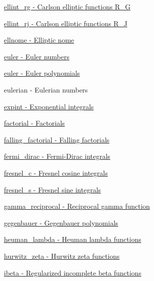 \begin{DoxyItemize}
\item \hyperlink{group__gnu__math__spec__func_gab525116e1b311da90e2745366ac314eb}{ellint\+\_\+rg -\/ Carlson elliptic functions R\+\_\+G}
\item \hyperlink{group__gnu__math__spec__func_gaf9a96979913713963c5f4edeba8c7f5a}{ellint\+\_\+rj -\/ Carlson elliptic functions R\+\_\+J}
\item \hyperlink{group__gnu__math__spec__func_ga7bfb34f8b5c0ed7c72040f9cb7034bba}{ellnome -\/ Elliptic nome}
\item \hyperlink{group__gnu__math__spec__func_gac956e6457ab7d0d1765d281e73073f55}{euler -\/ Euler numbers}
\item \hyperlink{group__gnu__math__spec__func_gac956e6457ab7d0d1765d281e73073f55}{euler -\/ Euler polynomials}
\item eulerian -\/ Eulerian numbers
\item \hyperlink{group__gnu__math__spec__func_ga2cfc699129ceac9cfed87c61e6dc0e08}{expint -\/ Exponential integrals}
\item \hyperlink{group__gnu__math__spec__func_ga48bc268969bfc03eaeaf4bfd457bb25c}{factorial -\/ Factorials}
\item \hyperlink{group__gnu__math__spec__func_gad2388b5c45ec3d5d5f80032b08a03e7e}{falling\+\_\+factorial -\/ Falling factorials}
\item \hyperlink{group__gnu__math__spec__func_ga47dd583a4f3a19f797a5e074e357ba36}{fermi\+\_\+dirac -\/ Fermi-\/\+Dirac integrals}
\item \hyperlink{group__gnu__math__spec__func_gab6a34ce43bad4e8181ad9c40aebb9ada}{fresnel\+\_\+c -\/ Fresnel cosine integrals}
\item \hyperlink{group__gnu__math__spec__func_gaaf6e2b182d0abde6fde72c0b8b9f959c}{fresnel\+\_\+s -\/ Fresnel sine integrals}
\item \hyperlink{group__gnu__math__spec__func_ga5d0da7c5a9ba020da4ed87785a682133}{gamma\+\_\+reciprocal -\/ Reciprocal gamma function}
\item \hyperlink{group__gnu__math__spec__func_ga793df814fb4e1b60e926ead0be14cc87}{gegenbauer -\/ Gegenbauer polynomials}
\item \hyperlink{group__gnu__math__spec__func_gab73b2a75a662785fa102926dca3be59f}{heuman\+\_\+lambda -\/ Heuman lambda functions}
\item \hyperlink{group__gnu__math__spec__func_ga19b3014d94dd102c59a5c7776474be41}{hurwitz\+\_\+zeta -\/ Hurwitz zeta functions}
\item \hyperlink{group__gnu__math__spec__func_gae9a18423e325171ca0c61b411258fa65}{ibeta -\/ Regularized incomplete beta functions}

\end{DoxyItemize}
